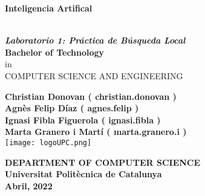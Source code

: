 \thispagestyle{empty}
\begin{center}
    \begin{LARGE}			\bf{Inteligencia Artifical\\}
    \end{LARGE}
    \vspace*{25pt}
    
    \textbf{\\
        \it{Laboratorio 1: Práctica de Búsqueda Local}\\}
        \vspace{20pt}
    \textbf{Bachelor of Technology\\}
    in\\
    \vspace{3pt}
    {COMPUTER SCIENCE AND ENGINEERING}\\
    \vspace{40pt}
    
    \textbf{
        Christian Donovan ( christian.donovan )\\
        Agnès Felip Díaz ( agnes.felip ) \\
        Ignasi Fibla Figuerola ( ignasi.fibla )\\
        Marta Granero i Martí ( marta.granero.i )}\\
    \vspace{30pt}
    \texttt{[image: logoUPC.png]} \\
    \vspace{160pt}
    
    \textbf{DEPARTMENT OF COMPUTER SCIENCE\\
        Universitat Politècnica de Catalunya\\
        Abril, 2022
    }
\end{center}

